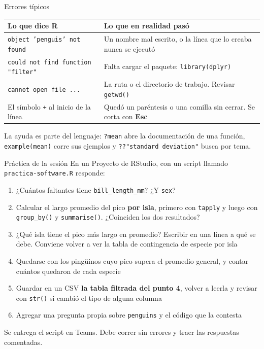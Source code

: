 \documentclass[aspectratio=169,10pt]{beamer}
\newcommand{\Rc}[1]{{\setlength{\fboxsep}{1.6pt}%
  \colorbox{codigoFondo}{\textcolor{codigoTexto}{\texttt{#1}}}}}
\newcommand{\destaca}[1]{%
  \par\vspace{3pt}\noindent
  \colorbox{azulClaro}{%
    \parbox{\dimexpr\linewidth-2\fboxsep\relax}{\vspace{3pt}#1\vspace{3pt}}}%
  \par\vspace{3pt}}
\begin{document}
\begin{frame}[fragile]{Errores típicos}
  \centering
  {\small
  \begin{tabular}{@{}p{6.2cm}p{6.2cm}@{}}
    \toprule
    \textbf{Lo que dice R} & \textbf{Lo que en realidad pasó} \\
    \midrule
    \texttt{object 'penguis' not found} &
      Un nombre mal escrito, o la línea que lo creaba nunca se ejecutó \\
    \texttt{could not find function "filter"} &
      Falta cargar el paquete: \Rc{library(dplyr)} \\
    \texttt{cannot open file ...} &
      La ruta o el directorio de trabajo. Revisar \Rc{getwd()} \\
    El símbolo \texttt{+} al inicio de la línea &
      Quedó un paréntesis o una comilla sin cerrar. Se corta con \textbf{Esc} \\
    \bottomrule
  \end{tabular}}
  \vspace{0.45cm}
  \raggedright
  \destaca{La ayuda es parte del lenguaje:
  \Rc{?mean} abre la documentación de una función,
  \Rc{example(mean)} corre sus ejemplos y
  \Rc{??"standard deviation"} busca por tema.}
\end{frame}
\begin{frame}[fragile]{Práctica de la sesión}
  En un Proyecto de RStudio, con un script llamado \texttt{practica-software.R} responde:

  \vspace{0.25cm}
  \begin{enumerate}
    \item ¿Cuántos faltantes tiene \Rc{bill\_length\_mm}? ¿Y \Rc{sex}?
    \item Calcular el largo promedio del pico \textbf{por isla}, primero con \Rc{tapply} y luego
      con \Rc{group\_by()} y \Rc{summarise()}. ¿Coinciden los dos resultados?
    \item ¿Qué isla tiene el pico más largo en promedio? Escribir en una línea a qué
      se debe. Conviene volver a ver la tabla de contingencia de especie por isla
    \item Quedarse con los pingüinos cuyo pico supera el promedio general, y contar
      cuántos quedaron de cada especie
    \item Guardar en un CSV \textbf{la tabla filtrada del punto 4}, volver a leerla y
      revisar con \Rc{str()} si cambió el tipo de alguna columna
    \item Agregar una pregunta propia sobre \texttt{penguins} y el código que la contesta
  \end{enumerate}

  \vspace{0.3cm}
  \destaca{\small Se entrega el script en Teams. Debe correr sin errores y traer las
  respuestas comentadas. }

\end{frame}
\end{document}
